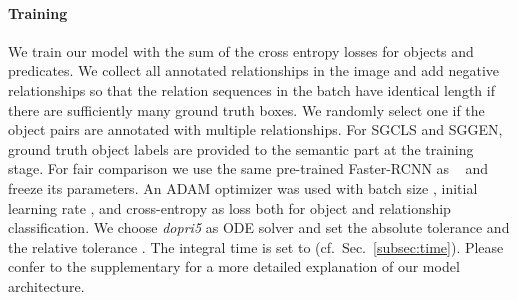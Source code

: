 \documentclass[runningheads]{llncs}
\begin{document}
\paragraph{Training}
We train our model with the sum of the cross entropy losses for objects and predicates. We collect all annotated relationships in the image and add negative relationships so that the relation sequences in the batch have identical length  if there are sufficiently many ground truth boxes. We randomly select one if the object pairs are annotated with multiple relationships. For SGCLS and SGGEN, ground truth object labels are provided to the semantic part at the training stage. For fair comparison we use the same pre-trained Faster-RCNN as ~\cite{zellers2018neural} and freeze its parameters. An ADAM optimizer was used with batch size , initial learning rate , and cross-entropy as loss both for object and relationship classification. 
We choose \emph{dopri5} as ODE solver and set the absolute tolerance  and the relative tolerance . The integral time  is set to  (cf.~Sec.~\ref{subsec:time}). 
Please confer to the supplementary for a more detailed explanation of our model architecture.
\end{document}
